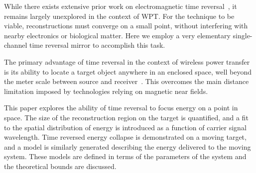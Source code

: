 While there exists extensive prior work on electromagnetic time
reversal~\cite{fink,nltr-wave-chaotic,nltr-classical-waves,tr-green}, it remains
largely unexplored in the context of WPT\@.
%
For the technique to be viable, reconstructions must converge on a small point,
without interfering with nearby electronics or biological matter.
%
Here we employ a very elementary single-channel time reversal mirror to
accomplish this task.



The primary advantage of time reversal in the context of wireless power transfer
is its ability to locate a target object anywhere in an enclosed space, well
beyond the meter scale between source and
receiver~\cite{fink,nltr-wave-chaotic}.
%
This overcomes the main distance limitation imposed by technologies relying
on magnetic near fields.



This paper explores the ability of time reversal to focus energy on a point in
space.
%
The size of the reconstruction region on the target is quantified, and a fit to
the spatial distribution of energy is introduced as a function of carrier signal
wavelength.
%
Time reversed energy collapse is demonstrated on a moving target, and a model is
similarly generated describing the energy delivered to the moving system.
%
These models are defined in terms of the parameters of the system and the
theoretical bounds are discussed.
